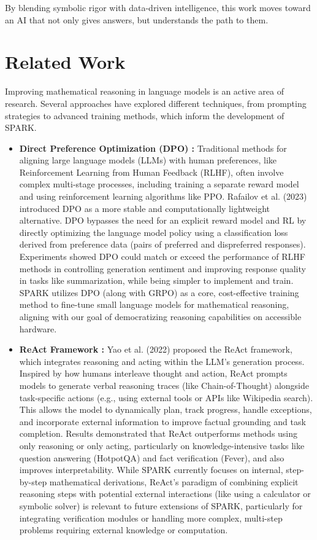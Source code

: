 \documentclass[11pt]{article}
\begin{document}
By blending symbolic rigor with data-driven intelligence, this work moves toward an AI that not only gives answers, but understands the path to them.


\section{Related Work}
Improving mathematical reasoning in language models is an active area of research. Several approaches have explored different techniques, from prompting strategies to advanced training methods, which inform the development of SPARK.

\begin{itemize}
    \item \textbf{Direct Preference Optimization (DPO) \cite{rafailov2023dpo}:}
    Traditional methods for aligning large language models (LLMs) with human preferences, like Reinforcement Learning from Human Feedback (RLHF), often involve complex multi-stage processes, including training a separate reward model and using reinforcement learning algorithms like PPO. Rafailov et al. (2023) introduced DPO as a more stable and computationally lightweight alternative. DPO bypasses the need for an explicit reward model and RL by directly optimizing the language model policy using a classification loss derived from preference data (pairs of preferred and dispreferred responses). Experiments showed DPO could match or exceed the performance of RLHF methods in controlling generation sentiment and improving response quality in tasks like summarization, while being simpler to implement and train. SPARK utilizes DPO (along with GRPO) as a core, cost-effective training method to fine-tune small language models for mathematical reasoning, aligning with our goal of democratizing reasoning capabilities on accessible hardware.

    \item \textbf{ReAct Framework \cite{yao2022react}:}
    Yao et al. (2022) proposed the ReAct framework, which integrates reasoning and acting within the LLM's generation process. Inspired by how humans interleave thought and action, ReAct prompts models to generate verbal reasoning traces (like Chain-of-Thought) alongside task-specific actions (e.g., using external tools or APIs like Wikipedia search). This allows the model to dynamically plan, track progress, handle exceptions, and incorporate external information to improve factual grounding and task completion. Results demonstrated that ReAct outperforms methods using only reasoning or only acting, particularly on knowledge-intensive tasks like question answering (HotpotQA) and fact verification (Fever), and also improves interpretability. While SPARK currently focuses on internal, step-by-step mathematical derivations, ReAct's paradigm of combining explicit reasoning steps with potential external interactions (like using a calculator or symbolic solver) is relevant to future extensions of SPARK, particularly for integrating verification modules or handling more complex, multi-step problems requiring external knowledge or computation.


\end{itemize}
\end{document}
